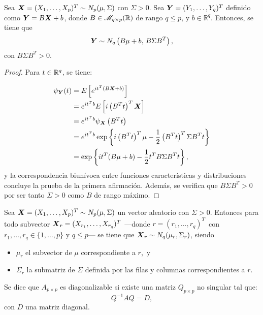  
    \begin{nprop}
      Sea $\boldsymbol{X} = (X_1,\dots,X_p)^T \sim N_p(\mu,\Sigma)$ con $\Sigma > 0$. Sea $\boldsymbol{Y} = (Y_1,\dots,Y_q)^T$ definido como $\boldsymbol{Y} = B\boldsymbol{X} + b$, donde $B\in \mathscr{M}_{q\times p}(\mathbb{R})$ de rango $q \leq p$, y $b \in \mathbb R^q$. Entonces, se tiene que
      \[
        \boldsymbol{Y} \sim N_q\left(B\mu+b,\, B\Sigma B^T\right),
      \]
      con $B\Sigma B^T > 0$.
    \end{nprop}
    \begin{proof}
      Para $t\in \mathbb{R}^q$, se tiene:

      \[
      \begin{split}
        \psi_{\boldsymbol{Y}}(t) & = E\left[ e^{it^T(B\boldsymbol{X} + b)} \right] \\
        & = e^{it^Tb} E\left[ i\left(B^Tt\right)^T\boldsymbol{X} \right] \\
        & = e^{it^Tb} \psi_{\boldsymbol{X}}\left(B^Tt\right) \\
        & = e^{it^Tb} \exp\left\{i\left(B^Tt\right)^T \mu- \frac{1}{2}\left(B^Tt\right)^T \Sigma B^Tt\right\} \\
        & = \exp\left\{it^T(B\mu + b) - \frac{1}{2}t^T B\Sigma B^Tt\right\},
      \end{split}
      \]
      y la correspondencia biunívoca entre funciones características y distribuciones concluye la prueba de la primera afirmación.
      Además, se verifica que $B\Sigma B^T > 0$ por ser tanto $\Sigma > 0$ como $B$ de rango máximo.
    \end{proof}

    \begin{ncor}[Marginalización]
      Sea $\boldsymbol{X} = (X_1,\dots,X_p)^T \sim N_p(\mu,\Sigma)$ un vector aleatorio con $\Sigma > 0$. Entonces para todo subvector $\boldsymbol{X}_r = (X_{r_1},\dots, X_{r_q})^T$ —donde $r = (r_1,\dots,r_q)^T$\, con $r_1,\dots,r_q \in \{1,\dots,p\}$ y $q \leq p$— se tiene que $\boldsymbol{X}_r \sim N_q(\mu_r, \Sigma_r)$, siendo
      \begin{itemize}
      \item $\mu_r$ el subvector de $\mu$ correspondiente a $r$,\, y
        \item $\Sigma_r$ la submatriz de $\Sigma$ definida por las filas y columnas correspondientes a $r$.
      \end{itemize}
    \end{ncor}

    \begin{ndef}
      Se dice que $A_{p\times p}$ es diagonalizable si existe una matriz $Q_{p \times p}$ no singular tal que:
      \[
      Q^{-1}AQ = D,
      \]
      con $D$ una matriz diagonal.
    \end{ndef}

